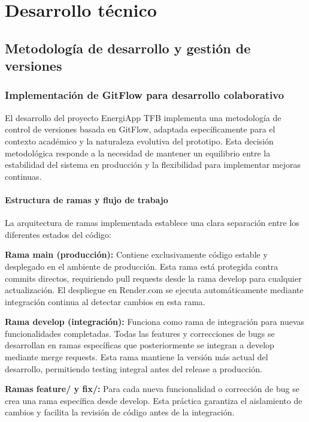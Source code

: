 \chapter{Desarrollo técnico}
\label{ch:desarrollo}

\section{Metodología de desarrollo y gestión de versiones}

\subsection{Implementación de GitFlow para desarrollo colaborativo}

El desarrollo del proyecto EnergiApp TFB implementa una metodología de control de versiones basada en GitFlow, adaptada específicamente para el contexto académico y la naturaleza evolutiva del prototipo. Esta decisión metodológica responde a la necesidad de mantener un equilibrio entre la estabilidad del sistema en producción y la flexibilidad para implementar mejoras continuas.

\subsubsection{Estructura de ramas y flujo de trabajo}

La arquitectura de ramas implementada establece una clara separación entre los diferentes estados del código:

\textbf{Rama main (producción):}
Contiene exclusivamente código estable y desplegado en el ambiente de producción. Esta rama está protegida contra commits directos, requiriendo pull requests desde la rama develop para cualquier actualización. El despliegue en Render.com se ejecuta automáticamente mediante integración continua al detectar cambios en esta rama.

\textbf{Rama develop (integración):}
Funciona como rama de integración para nuevas funcionalidades completadas. Todas las features y correcciones de bugs se desarrollan en ramas específicas que posteriormente se integran a develop mediante merge requests. Esta rama mantiene la versión más actual del desarrollo, permitiendo testing integral antes del release a producción.

\textbf{Ramas feature/ y fix/:}
Para cada nueva funcionalidad o corrección de bug se crea una rama específica desde develop. Esta práctica garantiza el aislamiento de cambios y facilita la revisión de código antes de la integración.

